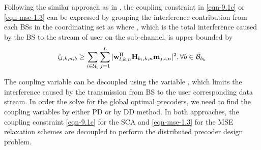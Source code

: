 Following the similar approach as in \cite{pennanen2011decentralized,tolli2011decentralized}, the coupling constraint in \eqref{eqn-9.1c} or \eqref{eqn-mse-1.3} can be expressed by grouping the interference contribution from each \acp{BS} in the coordinating set  as
\iftoggle{single_column}{
\begin{IEEEeqnarray}{rCl}\label{eqn-decent-3}
\beta_{l,k,n} & \geq & \sum_{\substack{j = 1\\j \neq l}}^L |\mvec{w}{l,k,n}^\herm \mvec{H}{b_k,k,n} \mvec{m}{j,k,n} |^2 \nonumber \\
&\quad& + \sum_{i \in \mc{U}_{b_k} \backslash \{k\}} \sum_{j = 1}^L |\mvec{w}{l,k,n}^\herm \mvec{H}{b_k,k,n} \mvec{m}{j,i,n} |^2 + \sum_{b \in \bar{\mc{B}}_{b_k}} \zeta_{l,k,n,b} \; + \; N_0\|\mvec{w}{l,k,n}\|^2
\end{IEEEeqnarray}
}{
\begin{multline}\label{eqn-decent-3}
	N_0\|\mvec{w}{l,k,n}\|^2 + \sum_{\substack{j = 1,j \neq l}}^L |\mvec{w}{l,k,n}^\herm \mvec{H}{b_k,k,n} \mvec{m}{j,k,n} |^2 + \sum_{b \in \bar{\mc{B}}_{b_k}} \zeta_{l,k,n,b}  \\
	+ \sum_{i \in \mc{U}_{b_k} \backslash \{k\}} \sum_{j = 1}^L |\mvec{w}{l,k,n}^\herm \mvec{H}{b_k,k,n} \mvec{m}{j,i,n} |^2 \leq \beta_{l,k,n}
\end{multline}
}
where , which is the total interference caused by the \ac{BS}  to the  stream of user  on the  sub-channel, is upper bounded by
\begin{equation}
\zeta_{l,k,n,b} \geq \sum_{i \in \mathcal{U}_b} \sum_{j = 1}^L |\mathbf{w}_{l,k,n}^{\mathrm{H}} \mathbf{H}_{b_i,k,n} \mathbf{m}_{j,i,n} |^2, \forall b \in \bar{\mathcal{B}}_{b_k}
\end{equation}

The coupling variable  can be decoupled using the variable , which limits the interference caused by the transmission from \ac{BS}  to the user  corresponding data stream. In order the solve for the global optimal precoders, we need to find the coupling variables  by either \acl{PD} or by \acl{DD} method. In both approaches, the coupling constraint \eqref{eqn-9.1c} for the \ac{SCA} and \eqref{eqn-mse-1.3} for the \ac{MSE} relaxation schemes are decoupled to perform the distributed precoder design problem. 